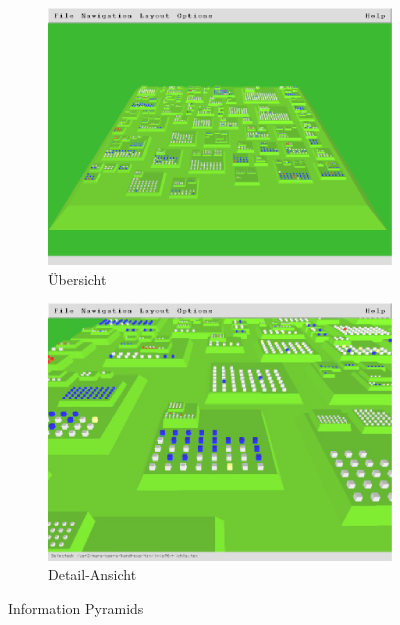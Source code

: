 \setlength{\fwidth}{.49\textwidth}
\begin{figure}[htbp]
	\centering
	\begin{subfigure}{\fwidth}
		\centering
		\includegraphics[width=\linewidth]{figures/information-pyramids}
		\caption{Übersicht} \label{fig:information-pyramids-overview}
	\end{subfigure}
	\hfill
	\begin{subfigure}{\fwidth}
		\centering
		\includegraphics[width=\linewidth]{figures/information-pyramids-drilled}
		\caption{Detail-Ansicht} \label{fig:information-pyramids-drilled}
	\end{subfigure}
	\caption{Information Pyramids \cite{andrews1997information}} \label{fig:information-pyramids}
\end{figure}


